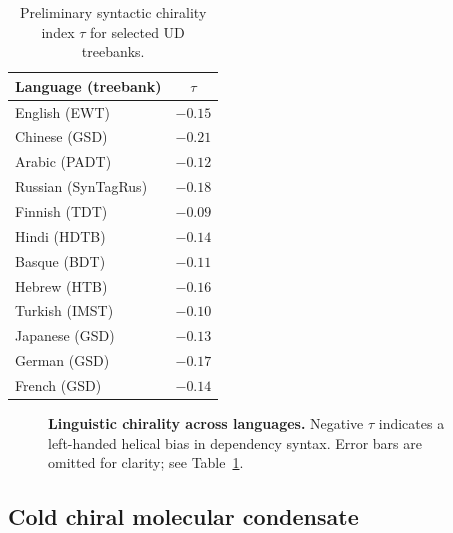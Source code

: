 \documentclass[twocolumn,11pt,a4paper]{article}
\begin{document}
\begin{table}[t]
\centering
\caption{Preliminary syntactic chirality index $\tau$ for selected UD treebanks.}
\label{tab:lang}
\begin{tabular}{@{}lc@{}}
\toprule
Language (treebank) & $\tau$ \\
\midrule
English (EWT) & $-0.15$ \\
Chinese (GSD) & $-0.21$ \\
Arabic (PADT) & $-0.12$ \\
Russian (SynTagRus) & $-0.18$ \\
Finnish (TDT) & $-0.09$ \\
Hindi (HDTB) & $-0.14$ \\
Basque (BDT) & $-0.11$ \\
Hebrew (HTB) & $-0.16$ \\
Turkish (IMST) & $-0.10$ \\
Japanese (GSD) & $-0.13$ \\
German (GSD) & $-0.17$ \\
French (GSD) & $-0.14$ \\
\bottomrule
\end{tabular}
\end{table}

\begin{figure}[t]
\centering
{}
\caption{\textbf{Linguistic chirality across languages.} Negative $\tau$ indicates a left-handed helical bias in dependency syntax. Error bars are omitted for clarity; see Table~\ref{tab:lang}.}
\label{fig:lang}
\end{figure}

\subsection{Cold chiral molecular condensate}
\end{document}
